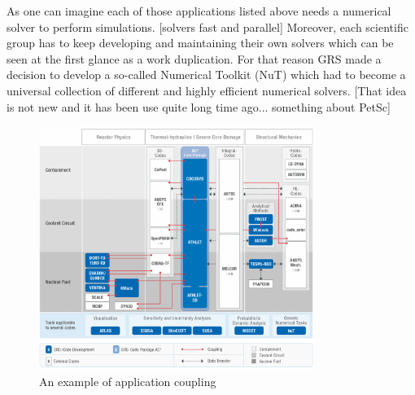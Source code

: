 As one can imagine each of those applications listed above needs a numerical solver to perform simulations. [solvers fast and parallel] Moreover, each scientific group has to keep developing and maintaining their own solvers which can be seen at the first glance as a work duplication. For that reason GRS made a decision to develop a so-called Numerical Toolkit (NuT) which had to become a universal collection of different and highly efficient numerical solvers. [That idea is not new and it has been use quite long time ago... something about PetSc]

\begin{figure}[htpb]
  \centering
  \includegraphics[width=0.8\textwidth]{figures/grs-application-coupling.png}
  \caption{An example of application coupling} \label{fig:applications}
\end{figure}